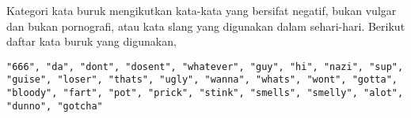 \label{lampiran:words_bad}

Kategori kata buruk mengikutkan kata-kata yang bersifat negatif, bukan vulgar
dan bukan pornografi, atau kata slang yang digunakan dalam sehari-hari.
Berikut daftar kata buruk yang digunakan,

\begin{lstlisting}
"666", "da", "dont", "dosent", "whatever", "guy", "hi", "nazi", "sup",
"guise", "loser", "thats", "ugly", "wanna", "whats", "wont", "gotta",
"bloody", "fart", "pot", "prick", "stink", "smells", "smelly", "alot",
"dunno", "gotcha"
\end{lstlisting}

